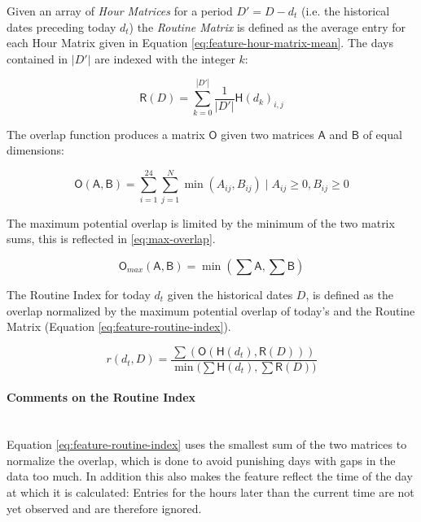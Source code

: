Given an array of \textit{Hour Matrices} for a period $D' = D - d_t$ (i.e. the historical dates preceding today $d_t$) the \textit{Routine Matrix} is defined as the average entry for each Hour Matrix given in Equation \eqref{eq:feature-hour-matrix-mean}. The days contained in $|D'|$ are indexed with the integer $k$:

\begin{equation}
\label{eq:feature-hour-matrix-mean}
\mathsf{R}(D) = \sum_{k=0}^{|D'|} \frac{1}{|D'|} \mathsf{H}(d_{k})_{i,j}
\end{equation}

The overlap function produces a matrix $\mathsf{O}$ given two matrices $\mathsf{A}$ and $\mathsf{B}$ of equal dimensions:

\begin{equation}
\label{eq:overlap-function}
    \mathsf{O}(\mathsf{A}, \mathsf{B}) = \sum_{i=1}^{24} \sum_{j=1}^{N} \min (A_{ij}, B_{ij}) \;|\; A_{ij} \geq 0, B_{ij} \geq 0
\end{equation}

The maximum potential overlap is limited by the minimum of the two matrix sums, this is reflected in \eqref{eq:max-overlap}.

\begin{equation}
\label{eq:max-overlap}
    \mathsf{O}_{max}(\mathsf{A}, \mathsf{B}) = \min (\sum \mathsf{A}, \sum \mathsf{B})
\end{equation}

The Routine Index for today $d_t$ given the historical dates $D$, is defined as the overlap normalized by the maximum potential overlap of today's  and the Routine Matrix (Equation \eqref{eq:feature-routine-index}).

\begin{equation}
\label{eq:feature-routine-index}
r(d_t, D) = \frac{\sum (\mathsf{O} (\mathsf{H}(d_t), \mathsf{R}(D)))}{\min \Big(\sum \mathsf{H}(d_t), \sum \mathsf{R}(D) \Big)}
\end{equation}

\paragraph{Comments on the Routine Index}\\
Equation \eqref{eq:feature-routine-index} uses the smallest sum of the two matrices to normalize the overlap, which is done to avoid punishing days with gaps in the data too much. In addition this also makes the feature reflect the time of the day at which it is calculated: Entries for the hours later than the current time are not yet observed and are therefore ignored.\\

